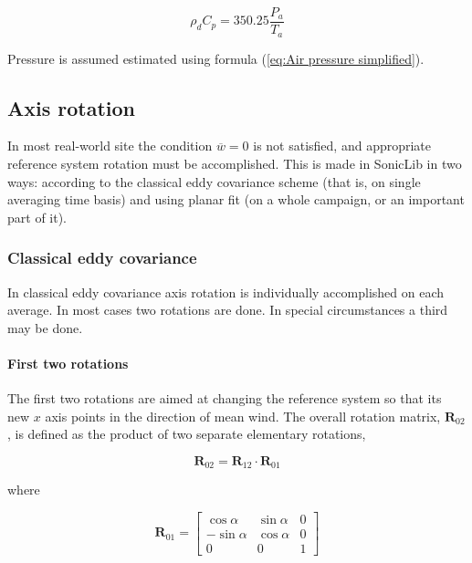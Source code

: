 \documentclass[a4paper,10pt]{book}
\begin{document}
\begin{equation}\label{eq:RhoCp simplified}
 \rho_{d} C_{p} = 350.25 \frac{P_{a}}{T_{a}}
\end{equation} 

Pressure is assumed estimated using formula (\ref{eq:Air pressure simplified}).

\subsection{Axis rotation}

In most real-world site the condition $\overline{w} = 0$ is not satisfied, and appropriate reference system rotation must be accomplished. This is made in SonicLib in two ways: according to the classical eddy covariance scheme (that is, on single averaging time basis) and using planar fit (on a whole campaign, or an important part of it).

\subsubsection{Classical eddy covariance}
\label{sec:Classical eddy covariance}

In classical eddy covariance axis rotation is individually accomplished on each average. In most cases two rotations are done. In special circumstances a third may be done.

\paragraph{First two rotations}
\label{sec:First two rotations}

The first two rotations are aimed at changing the reference system so that its new $x$ axis points in the direction of mean wind. The overall rotation matrix, $\mathbf{R}_{02}$, is defined as the product of two separate elementary rotations,

\begin{equation}\label{eq:First two rotations in EC}
 \mathbf{R}_{02} = \mathbf{R}_{12} \cdot \mathbf{R}_{01}
\end{equation}

\noindent where

\begin{equation}\label{eq:First rotation in EC}
 \mathbf{R}_{01} = \left[
  \begin{array}{ccc}
   \cos \alpha & \sin \alpha & 0 \\
  -\sin \alpha & \cos \alpha & 0 \\
       0       &      0      & 1
  \end{array}
 \right]
\end{equation}
\end{document}
